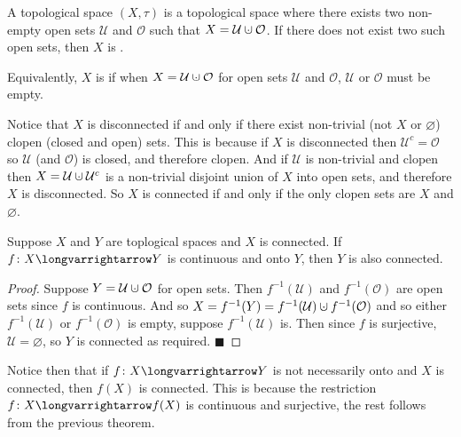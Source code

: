 \documentclass[10pt]{article}
\def\qed{\hskip1cm\penalty-100\hbox{}\hfill$\blacksquare$}
\def\mU{\mathcal{U}}
\def\mO{\mathcal{O}}
\def\longto{\longvarrightarrow}
\begin{document}


\bigskip

\begin{defn*}

    A  topological space $(X,\tau)$ is a topological space where there exists two non-empty open sets $\mU$ and $\mO$ such that $X=\mU\dcup\mO$.
    If there does not exist two such open sets, then $X$ is .

\end{defn*}

Equivalently, $X$ is  if when $X=\mU\dcup\mO$ for open sets $\mU$ and $\mO$, $\mU$ or $\mO$ must be empty.

Notice that $X$ is disconnected if and only if there exist non-trivial (not $X$ or $\varnothing$) clopen (closed and open) sets.
This is because if $X$ is disconnected then $\mU^c=\mO$ so $\mU$ (and $\mO$) is closed, and therefore clopen.
And if $\mU$ is non-trivial and clopen then $X=\mU\dcup\mU^c$ is a non-trivial disjoint union of $X$ into open sets, and therefore $X$ is disconnected.
So $X$ is connected if and only if the only clopen sets are $X$ and $\varnothing$.

\begin{thrm*}

    Suppose $X$ and $Y$ are toplogical spaces and $X$ is connected.
    If $f\colon X\longto Y$ is continuous and onto $Y$, then $Y$ is also connected.

\end{thrm*}

\begin{proof}

    Suppose $Y=\mU\dcup\mO$ for open sets.
    Then $f^{-1}(\mU)$ and $f^{-1}(\mO)$ are open sets since $f$ is continuous.
    And so $X=f^{-1}(Y)=f^{-1}(\mU)\dcup f^{-1}(\mO)$ and so either $f^{-1}(\mU)$ or $f^{-1}(\mO)$ is empty, suppose $f^{-1}(\mU)$ is.
    Then since $f$ is surjective, $\mU=\varnothing$, so $Y$ is connected as required.
    \qed

\end{proof}

Notice then that if $f\colon X\longto Y$ is not necessarily onto and $X$ is connected, then $f(X)$ is connected.
This is because the restriction $f\colon X\longto f(X)$ is continuous and surjective, the rest follows from the previous theorem.
\end{document}
